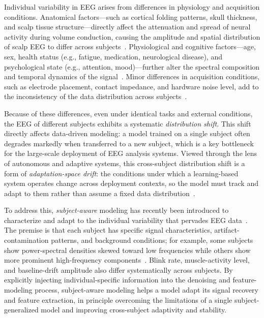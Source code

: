 Individual variability in EEG arises from differences in physiology and
acquisition conditions. Anatomical factors---such as cortical folding patterns,
skull thickness, and scalp tissue structure---directly affect the attenuation
and spread of neural activity during volume conduction, causing the amplitude
and spatial distribution of scalp EEG to differ across
subjects~\cite{jiao2018sparse}. Physiological and cognitive factors---age, sex,
health status (e.g., fatigue, medication, neurological disease), and
psychological state (e.g., attention, mood)---further alter the spectral
composition and temporal dynamics of the signal~\cite{yin2022frequency}. Minor
differences in acquisition conditions, such as electrode placement, contact
impedance, and hardware noise level, add to the inconsistency of the data
distribution across subjects~\cite{ghosh2019eyeblink}.

Because of these differences, even under identical tasks and external
conditions, the EEG of different subjects exhibits a systematic
\emph{distribution shift}. This shift directly affects data-driven modeling: a
model trained on a single subject often degrades markedly when transferred to a
new subject, which is a key bottleneck for the large-scale deployment of EEG
analysis systems. Viewed through the lens of autonomous and adaptive systems,
this cross-subject distribution shift is a form of \emph{adaptation-space drift}:
the conditions under which a learning-based system operates change across
deployment contexts, so the model must track and adapt to them rather than assume
a fixed data distribution~\cite{gheibi2024drift}.

To address this, \emph{subject-aware} modeling has recently been introduced to
characterize and adapt to the individual variability that pervades EEG
data~\cite{jiao2018sparse}. The premise is that each subject has specific signal
characteristics, artifact-contamination patterns, and background conditions; for
example, some subjects show power-spectral densities skewed toward low
frequencies while others show more prominent high-frequency
components~\cite{yin2022frequency}. Blink rate, muscle-activity level, and
baseline-drift amplitude also differ systematically across subjects. By
explicitly injecting individual-specific information into the denoising and
feature-modeling process, subject-aware modeling helps a model adapt its signal
recovery and feature extraction, in principle overcoming the limitations of a
single subject-generalized model and improving cross-subject adaptivity and
stability.

